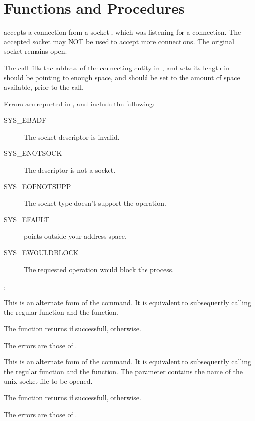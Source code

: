 \section {Functions and Procedures}

{ accepts a connection from a socket , which was
listening for a connection. The accepted socket may NOT be used to accept
more connections. The original socket remains open.

The  call fills the address of the connecting entity in ,
and sets its length in .  should be pointing to
enough space, and  should be set to the amount of space
available, prior to the call.
}
{Errors are reported in , and include the following:
\begin{description}
\item[SYS\_EBADF] The socket descriptor is invalid.
\item[SYS\_ENOTSOCK] The descriptor is not a socket.
\item[SYS\_EOPNOTSUPP] The socket type doesn't support the 
operation.
\item[SYS\_EFAULT]  points outside your address space.
\item[SYS\_EWOULDBLOCK] The requested operation would block the process.
\end{description}
}
{, }



{ This is an alternate form of the  command. It is equivalent
to subsequently calling the regular 
function and the  function.

The function returns  if successfull,  otherwise.
}
{The errors are those of .}
{}

{ This is an alternate form of the  command. 
It is equivalent
to subsequently calling the regular  function and the 
 function.
The  parameter contains the name of the unix socket file to be
opened. 

The function returns  if successfull,  otherwise.
}
{The errors are those of .}
{}


